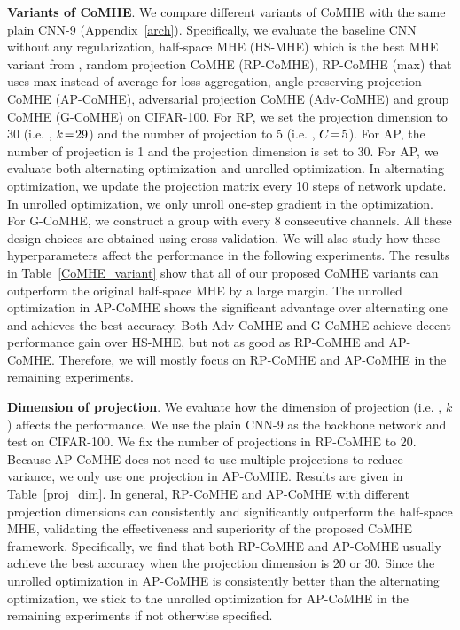 \textbf{Variants of CoMHE}. We compare different variants of CoMHE with the same plain CNN-9 (Appendix~\ref{arch}). Specifically, we evaluate the baseline CNN without any regularization, half-space MHE (HS-MHE) which is the best MHE variant from \cite{LiuNIPS18}, random projection CoMHE (RP-CoMHE), RP-CoMHE (max) that uses max instead of average for loss aggregation, angle-preserving projection CoMHE (AP-CoMHE), adversarial projection CoMHE (Adv-CoMHE) and group CoMHE (G-CoMHE) on CIFAR-100. For RP, we set the projection dimension to 30 (i.e. , $\thickmuskip=2mu \medmuskip=2mu k=29$) and the number of projection to 5 (i.e. , $\thickmuskip=2mu \medmuskip=2mu C=5$). For AP, the number of projection is 1 and the projection dimension is set to 30. For AP, we evaluate both alternating optimization and unrolled optimization. In alternating optimization, we update the projection matrix every 10 steps of network update. In unrolled optimization, we only unroll one-step gradient in the optimization. For G-CoMHE, we construct a group with every 8 consecutive channels. All these design choices are obtained using cross-validation. We will also study how these hyperparameters affect the performance in the following experiments. The results in Table~\ref{CoMHE_variant} show that all of our proposed CoMHE variants can outperform the original half-space MHE by a large margin. The unrolled optimization in AP-CoMHE shows the significant advantage over alternating one and achieves the best accuracy. Both Adv-CoMHE and G-CoMHE achieve decent performance gain over HS-MHE, but not as good as RP-CoMHE and AP-CoMHE. Therefore, we will mostly focus on RP-CoMHE and AP-CoMHE in the remaining experiments.
\par

\textbf{Dimension of projection}. We evaluate how the dimension of projection (i.e. , $k$) affects the performance. We use the plain CNN-9 as the backbone network and test on CIFAR-100. We fix the number of projections in RP-CoMHE to 20. Because AP-CoMHE does not need to use multiple projections to reduce variance, we only use one projection in AP-CoMHE. Results are given in Table~\ref{proj_dim}. In general, RP-CoMHE and AP-CoMHE with different projection dimensions can consistently and significantly outperform the half-space MHE, validating the effectiveness and superiority of the proposed CoMHE framework. Specifically, we find that both RP-CoMHE and AP-CoMHE usually achieve the best accuracy when the projection dimension is 20 or 30. Since the unrolled optimization in AP-CoMHE is consistently better than the alternating optimization, we  stick to the unrolled optimization for AP-CoMHE in the remaining experiments if not otherwise specified.
\par

